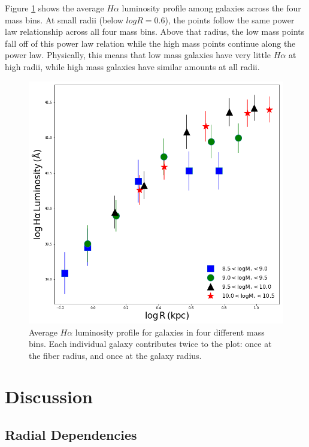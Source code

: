 \documentclass[iop]{emulateapj}
\begin{document}
Figure \ref{fig:grad_lum} shows the average $H\alpha$ luminosity profile among galaxies across the four mass bins. At small radii (below $log R =0.6$), the points follow the same power law relationship across all four mass bins. Above that radius, the low mass points fall off of this power law relation while the high mass points continue along the power law. Physically, this means that low mass galaxies have very little $H\alpha$ at high radii, while high mass galaxies have similar amounts at all radii.


\begin{figure}
	\centering
	\includegraphics[width= \columnwidth]{gradients_HA.png}
	\caption{Average $H\alpha$ luminosity profile for galaxies in four different mass bins. Each individual galaxy contributes twice to the plot: once at the fiber radius, and once at the galaxy radius.}
     \label{fig:grad_lum}

\end{figure}

\section{Discussion}
\label{(sec:discuss)}
\subsection{Radial Dependencies}
\end{document}
